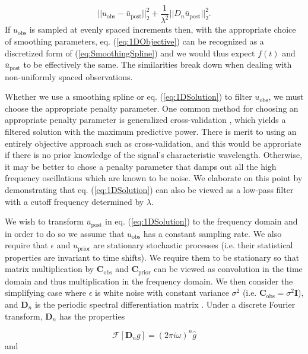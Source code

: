 \documentclass[10pt,a4paper]{article}
\begin{document}
\begin{equation}\label{eq:1DObjective}
||u_\mathrm{obs} - \bar{u}_\mathrm{post}||_2^2 + \frac{1}{\lambda^2}||D_n\bar{u}_\mathrm{post}||_2^2.
\end{equation} 
If $u_\mathrm{obs}$ is sampled at evenly spaced increments then, with the appropriate choice of smoothing parameters, eq. (\ref{eq:1DObjective}) can be recognized as a discretized form of (\ref{eq:SmoothingSpline}) and we would thus expect $f(t)$ and $\bar{u}_\mathrm{post}$ to be effectively the same. The similarities break down when dealing with non-uniformly spaced observations.  

Whether we use a smoothing spline or eq. (\ref{eq:1DSolution}) to filter $u_\mathrm{obs}$, we must choose the appropriate penalty parameter.  One common method for choosing an appropriate penalty parameter is generalized cross-validation \citep{Craven1979}, which yields a filtered solution with the maximum predictive power.  There is merit to using an entirely objective approach such as cross-validation, and this would be approriate if there is no prior knowledge of the signal's characteristic wavelength.  Otherwise, it may be better to chose a penalty parameter that damps out all the high frequency oscillations which are known to be noise.  We elaborate on this point by demonstrating that eq. (\ref{eq:1DSolution}) can also be viewed as a low-pass filter with a cutoff frequency determined by $\lambda$.  

We wish to transform $\bar{u}_\mathrm{post}$ in eq. (\ref{eq:1DSolution}) to the frequency domain and in order to do so we assume that $u_\mathrm{obs}$ has a constant sampling rate. We also require that $\epsilon$ and $u_\mathrm{prior}$ are stationary stochastic processes (i.e. their statistical properties are invariant to time shifts).  We require them to be stationary so that matrix multiplication by $\mathbf{C}_\mathrm{obs}$ and $\mathbf{C}_\mathrm{prior}$ can be viewed as convolution in the time domain and thus multiplication in the frequency domain.  We then consider the simplifying case where $\epsilon$ is white noise with constant variance $\sigma^2$ (i.e. $\mathbf{C}_\mathrm{obs} = \sigma^2\mathbf{I}$), and $\mathbf{D}_n$ is the periodic spectral differentiation matrix \citep[e.g.][]{Trefethen2000}.  Under a discrete Fourier transform, $\mathbf{D}_n$ has the properties

\begin{equation}\label{eq:Property1}
  \mathcal{F}[\mathbf{D}_ng] = (2\pi i\omega)^n \hat{g}
\end{equation}
and
\end{document}
